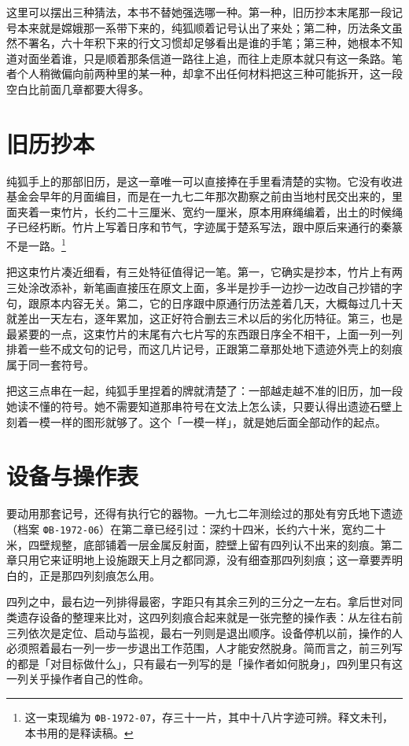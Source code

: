 这里可以摆出三种猜法，本书不替她强选哪一种。第一种，旧历抄本末尾那一段记号本来就是嫦娥那一系带下来的，纯狐顺着记号认出了来处；第二种，历法条文虽然不署名，六十年积下来的行文习惯却足够看出是谁的手笔；第三种，她根本不知道对面坐着谁，只是顺着那条信道一路往上追，而往上走原本就只有这一条路。笔者个人稍微偏向前两种里的某一种，却拿不出任何材料把这三种可能拆开，这一段空白比前面几章都要大得多。

\section{旧历抄本}

纯狐手上的那部旧历，是这一章唯一可以直接捧在手里看清楚的实物。它没有收进基金会早年的月面编目，而是在一九七二年那次勘察之前由当地村民交出来的，里面夹着一束竹片，长约二十三厘米、宽约一厘米，原本用麻绳编着，出土的时候绳子已经朽断。竹片上写着日序和节气，字迹属于楚系写法，跟中原后来通行的秦篆不是一路。\footnote{这一束现编为 \texttt{ФВ-1972-07}，存三十一片，其中十八片字迹可辨。释文未刊，本书用的是释读稿。}

把这束竹片凑近细看，有三处特征值得记一笔。第一，它确实是抄本，竹片上有两三处涂改添补，新笔画直接压在原文上面，多半是抄手一边抄一边改自己抄错的字句，跟原本内容无关。第二，它的日序跟中原通行历法差着几天，大概每过几十天就差出一天左右，逐年累加，这正好符合删去三术以后的劣化历特征。第三，也是最紧要的一点，这束竹片的末尾有六七片写的东西跟日序全不相干，上面一列一列排着一些不成文句的记号，而这几片记号，正跟第二章那处地下遗迹外壳上的刻痕属于同一套符号。

把这三点串在一起，纯狐手里捏着的牌就清楚了：一部越走越不准的旧历，加一段她读不懂的符号。她不需要知道那串符号在文法上怎么读，只要认得出遗迹石壁上刻着一模一样的图形就够了。这个「一模一样」，就是她后面全部动作的起点。

\section{设备与操作表}

要动用那套记号，还得有执行它的器物。一九七二年测绘过的那处有穷氏地下遗迹（档案 \texttt{ФВ-1972-06}）在第二章已经引过：深约十四米，长约六十米，宽约二十米，四壁规整，底部铺着一层金属反射面，腔壁上留有四列认不出来的刻痕。第二章只用它来证明地上设施跟天上月之都同源，没有细查那四列刻痕；这一章要弄明白的，正是那四列刻痕怎么用。

四列之中，最右边一列排得最密，字距只有其余三列的三分之一左右。拿后世对同类遗存设备的整理来比对，这四列刻痕合起来就是一张完整的操作表：从左往右前三列依次是定位、启动与监视，最右一列则是退出顺序。设备停机以前，操作的人必须照着最右一列一步一步退出工作范围，人才能安然脱身。简而言之，前三列写的都是「对目标做什么」，只有最右一列写的是「操作者如何脱身」，四列里只有这一列关乎操作者自己的性命。

